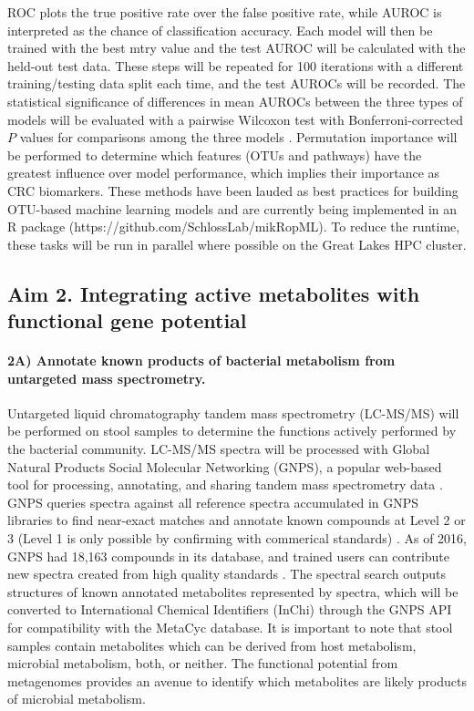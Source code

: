 \documentclass[11pt]{article}
\begin{document}
ROC plots the true positive rate over the false positive rate, while AUROC is interpreted as the chance of classification accuracy.
Each model will then be trained with the best mtry value and the test AUROC will be calculated with the held-out test data.
These steps will be repeated for 100 iterations with a different training/testing data split each time, and the test AUROCs will be recorded.
The statistical significance of differences in mean AUROCs between the three types of models will be evaluated with a pairwise Wilcoxon test with Bonferroni-corrected $P$ values for comparisons among the three models \cite{hannigan_diagnostic_2018}.
Permutation importance will be performed to determine which features (OTUs and pathways) have the greatest influence over model performance, which implies their importance as CRC biomarkers.
These methods have been lauded as best practices for building OTU-based machine learning models \cite{topcuoglu_framework_2020} and are currently being implemented in an R package (https://github.com/SchlossLab/mikRopML).
To reduce the runtime, these tasks will be run in parallel where possible on the Great Lakes HPC cluster.

\subsection*{Aim 2. Integrating active metabolites with functional gene potential}

\paragraph{2A) Annotate known products of bacterial metabolism from untargeted mass spectrometry.}

Untargeted liquid chromatography tandem mass spectrometry (LC-MS/MS) will be performed on stool samples to determine the functions actively performed by the bacterial community.
LC-MS/MS spectra will be processed with Global Natural Products Social Molecular Networking (GNPS), a popular web-based tool for processing, annotating, and sharing tandem mass spectrometry data \cite{wang_sharing_2016}.
GNPS queries spectra against all reference spectra accumulated in GNPS libraries to find near-exact matches and annotate known compounds at Level 2 or 3 (Level 1 is only possible by confirming with commerical standards) \cite{aron_reproducible_2020}.
As of 2016, GNPS had 18,163 compounds in its database, and trained users can contribute new spectra created from high quality standards \cite{vargas_protocol_2019}.
The spectral search outputs structures of known annotated metabolites represented by spectra, which will be converted to International Chemical Identifiers (InChi) through the GNPS API for compatibility with the MetaCyc database.
It is important to note that stool samples contain metabolites which can be derived from host metabolism, microbial metabolism, both, or neither.
The functional potential from metagenomes provides an avenue to identify which metabolites are likely products of microbial metabolism.
\end{document}
